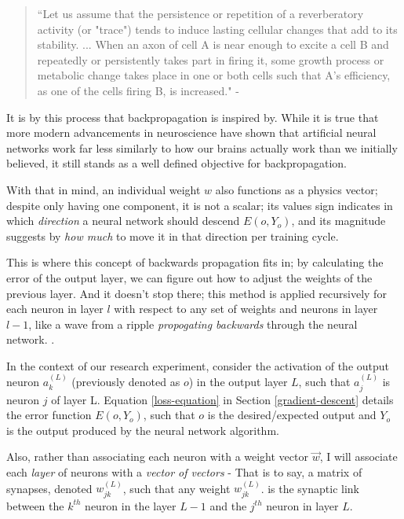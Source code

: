 \documentclass[12pt]{article}
\begin{document}
\begin{quote}
  ``Let us assume that the persistence or repetition of a reverberatory activity (or "trace") tends to induce lasting cellular changes that add to its stability. ... When an axon of cell A is near enough to excite a cell B and repeatedly or persistently takes part in firing it, some growth process or metabolic change takes place in one or both cells such that A's efficiency, as one of the cells firing B, is increased." - \textcite{Hebb1949}
\end{quote}

It is by this process that backpropagation is inspired by. While it is true that more modern advancements in neuroscience have shown that artificial neural networks work far less similarly to how our brains actually work than we initially believed, it still stands as a well defined objective for backpropagation.

With that in mind, an individual weight $w$ also functions as a physics vector; despite only having one component, it is not a scalar; its values sign indicates in which \textit{direction} a neural network should descend $E(o, Y_o)$, and its magnitude suggests by \textit{how much} to move it in that direction per training cycle.

This is where this concept of backwards propagation fits in; by calculating the error of the output layer, we can figure out how to adjust the weights of the previous layer. And it doesn't stop there; this method is applied recursively for each neuron in layer $l$ with respect to any set of weights and neurons in layer $l - 1$, like a wave from a ripple \textit{propogating backwards} through the neural network. \textcite{Nielsen2015}.


In the context of our research experiment, consider the activation of the output neuron $a_k^{(L)}$ (previously denoted as $o$) in the output layer $L$, such that $a_j^{(L)}$ is neuron $j$ of layer L. Equation \ref{loss-equation} in Section \ref{gradient-descent} details the error function $E(o, Y_o)$, such that $o$ is the desired/expected output and $Y_o$ is the output produced by the neural network algorithm.

Also, rather than associating each neuron with a weight vector $\vec{w}$, I will associate each \textit{layer} of neurons with a \textit{vector of vectors} - That is to say, a matrix of synapses, denoted $w_{jk}^{(L)}$, such that any weight $w_{jk}^{(L)}$. is the synaptic link between the $k^{th}$ neuron in the layer $L-1$ and the $j^{th}$ neuron in layer $L$.
\end{document}
